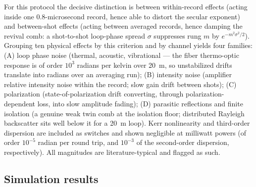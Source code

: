 \documentclass[11pt,a4paper]{article}
\begin{document}
For this protocol the decisive distinction is between within-record effects
(acting inside one 0.8-microsecond record, hence able to distort the secular
exponent) and between-shot effects (acting between averaged records, hence
damping the revival comb: a shot-to-shot loop-phase spread $\sigma$ suppresses
rung $m$ by $e^{-m^2 \sigma^2 / 2}$). Grouping ten physical effects by this
criterion and by channel yields four families: (A) loop phase noise (thermal,
acoustic, vibrational --- the fiber thermo-optic response is of order $10^3$
radians per kelvin over 20~m, so unstabilized drifts translate into radians
over an averaging run); (B) intensity noise (amplifier relative intensity noise
within the record; slow gain drift between shots); (C) polarization
(state-of-polarization drift converting, through polarization-dependent loss,
into slow amplitude fading); (D) parasitic reflections and finite isolation (a
genuine weak twin comb at the isolation floor; distributed Rayleigh backscatter
sits well below it for a 20~m loop). Kerr nonlinearity and third-order
dispersion are included as switches and shown negligible at milliwatt powers
(of order $10^{-5}$ radian per round trip, and $10^{-3}$ of the second-order
dispersion, respectively). All magnitudes are literature-typical and flagged as
such.

\subsection{Simulation results}
\end{document}

